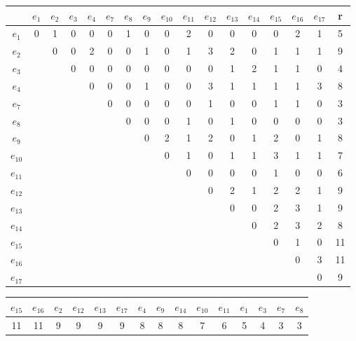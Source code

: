 \documentclass[12pt, a4paper] {ncc}
\begin{document}
\begin{enumerate}
\begin{enumerate}
\begin{tabular}{|c|c|c|c|c|c|c|c|c|c|c|c|c|c|c|c|c|}
\hline
      & $e_{1}$ & $e_{2}$ & $e_{3}$ & $e_{4}$ & $e_{7}$ & $e_{8}$ & $e_{9}$ & $e_{10}$ & $e_{11}$ & $e_{12}$ & $e_{13}$ & $e_{14}$ & $e_{15}$ & $e_{16}$ & $e_{17}$ & r \\
\hline
$e_{1}$  & 0 & 1 & 0 & 0 &  0 & 1 & 0 & 0 & 2 & 0 & 0 & 0 & 0 & 2 & 1 & 5 \\ \hline
$e_{2}$  &   & 0 & 0 & 2 &  0 & 0 & 1 & 0 & 1 & 3 & 2 & 0 & 1 & 1 & 1 & 9 \\ \hline
$e_{3}$  &   &   & 0 & 0 &  0 & 0 & 0 & 0 & 0 & 0 & 1 & 2 & 1 & 1 & 0 & 4 \\ \hline
$e_{4}$  &   &   &   & 0 &  0 & 0 & 1 & 0 & 0 & 3 & 1 & 1 & 1 & 1 & 3 & 8\\ \hline
$e_{7}$  &   &   &   &   &  0 & 0 & 0 & 0 & 0 & 1 & 0 & 0 & 1 & 1 & 0 & 3\\ \hline
$e_{8}$  &   &   &   &   &    & 0 & 0 & 0 & 1 & 0 & 1 & 0 & 0 & 0 & 0 & 3\\ \hline
$e_{9}$  &   &   &   &   &    &   & 0 & 2 & 1 & 2 & 0 & 1 & 2 & 0 & 1 & 8\\ \hline
$e_{10}$ &   &   &   &   &    &   &   & 0 & 1 & 0 & 1 & 1 & 3 & 1 & 1 & 7\\ \hline
$e_{11}$ &   &   &   &   &    &   &   &   & 0 & 0 & 0 & 0 & 1 & 0 & 0 & 6\\ \hline
$e_{12}$ &   &   &   &   &    &   &   &   &   & 0 & 2 & 1 & 2 & 2 & 1 & 9\\ \hline
$e_{13}$ &   &   &   &   &    &   &   &   &   &   & 0 & 0 & 2 & 3 & 1 & 9\\ \hline
$e_{14}$ &   &   &   &   &    &   &   &   &   &   &   & 0 & 2 & 3 & 2 & 8\\ \hline
$e_{15}$ &   &   &   &   &    &   &   &   &   &   &   &   & 0 & 1 & 0 & 11 \\ \hline
$e_{16}$ &   &   &   &   &    &   &   &   &   &   &   &   &   & 0 & 3 & 11 \\ \hline
$e_{17}$ &   &   &   &   &    &   &   &   &   &   &   &   &   &   & 0 & 9\\ \hline
\end{tabular}

\begin{center}
\begin{longtable}{|c c c c c c c c c c c c c c c|}
\hline
$e_{15}$ & $e_{16}$ & $e_{2}$ & $e_{12}$ & $e_{13}$ & $e_{17}$ & $e_{4}$ & $e_{9}$ & $e_{14}$ & $e_{10}$ & $e_{11}$ & $e_{1}$ & $e_{3}$ & $e_{7}$ & $e_{8}$ \\
\hline
11 & 11 & 9 & 9 & 9 & 9 & 8 & 8 & 8 & 7 & 6 & 5 & 4 & 3 & 3\\
\hline
\end{longtable}
\end{center}


\end{enumerate}
\end{enumerate}
\end{document}
